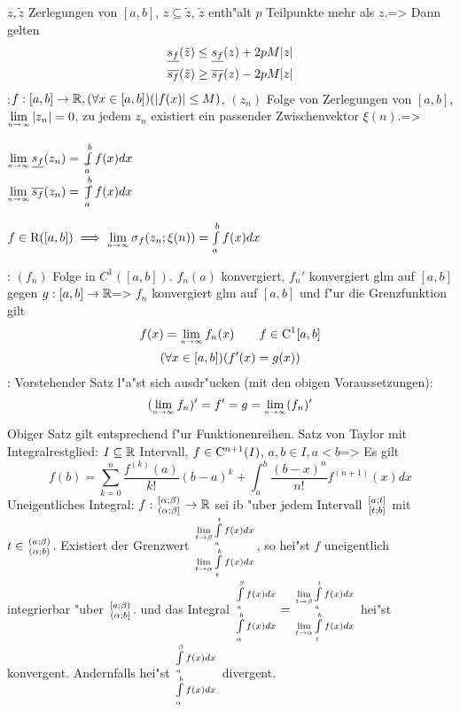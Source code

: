   $z,\tilde z$ Zerlegungen von $[a,b]$, $z\subseteq\tilde z$, 
  $\tilde z$ enth"alt $p$ Teilpunkte mehr als $z$.=>{
  Dann gelten
  \begin{align*}
    \underline{s_f}(\tilde z) &\le \underline{s_f}(z) + 2pM|z|\\
    \overline{s_f}(\tilde z) &\ge \overline{s_f}(z) - 2pM|z|\\
    \end{align*}
  }
\theorem:$f:[a,b]\to\mathbb R, (\forall x\in[a,b])(|f(x)|\le M)$, 
  $(z_n)$ Folge von Zerlegungen von $[a,b]$, $\limn|z_n|=0$,
  zu jedem $z_n$ existiert ein passender Zwischenvektor $\xi(n)$.=>{
  \begin{stmts}
    \item $\limn \lsum(z_n)=\lint_a^b f(x)dx$ \\
      $\limn \usum(z_n)=\uint_a^b f(x)dx$ 
    \item $f\in\SetRInt([a,b])\implies
      \limn \sigma_f(z_n;\xi(n))=\int_a^b f(x)dx$
    \end{stmts}
  }
\theorem: $(f_n)$ Folge in $C^1([a,b])$. $f_n(a)$ konvergiert, 
  $f_n'$ konvergiert glm auf $[a,b]$ gegen $g:[a,b]\to\mathbb R$=>{
  $f_n$ konvergiert glm auf $[a,b]$ und f"ur die Grenzfunktion gilt
  \begin{gather*}
    f(x)=\limn f_n(x)\qquad f\in\SetCont^1[a,b]\\
    (\forall x\in[a,b])(f'(x)=g(x))     
    \end{gather*}
  }
\remark:{
  Vorstehender Satz l"a"st sich ausdr"ucken (mit den obigen Voraussetzungen):
  \[(\limn f_n)'=f'=g=\limn (f_n)' 
    \]
  Obiger Satz gilt entsprechend f"ur Funktionenreihen.
  }
\theorem Satz von Taylor mit Integralrestglied:
  $I\subseteq\mathbb R$ Intervall, $f\in{\rm C}^{n+1}(I)$, $a,b\in I,a<b$=>
  {
  Es gilt
  \[f(b)=\sum_{k=0}^n \frac {f^{(k)}(a)}{k!} (b-a)^k+
         \int_a^b \frac{(b-x)^n}{n!}f^{(n+1)}(x) dx
    \]
  }
 Uneigentliches Integral:{
  $f:\stack({[\alpha;\beta)};{(\alpha;\beta]})\to\SetR$ sei ib "uber jedem
  Intervall $\stack({[a;t]};{[t;b]})$ mit $t\in\stack({(a;\beta)};{(\alpha;b)})$.
  Existiert der Grenzwert 
  $\stack({\limes t->\beta \int_a^t f(x)dx};{\limes t->\alpha \int_t^b f(x) dx})$,
  so hei"st $f$ uneigentlich integrierbar "uber $\stack({[a;\beta)};{(\alpha;b]})$.
  und das Integral
  $
    \stack({\int_a^\beta f(x)dx};{\int_\alpha^b f(x) dx})
    =
    \stack({\limes t->\beta \int_a^t f(x)dx};{\limes t->\alpha \int_t^b f(x) dx})
  $
  hei"st konvergent. Andernfalls hei"st
  $\stack({\int_a^\beta f(x)dx};{\int_\alpha^b f(x) dx})$ divergent.
  }
